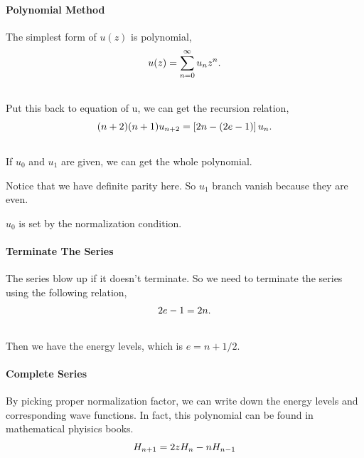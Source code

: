\documentclass[letterpaper,10pt,english]{sphinxmanual}
\begin{document}
\paragraph{Polynomial Method}
\label{QuantumMechanics:polynomial-method}
The simplest form of $u(z)$ is polynomial,
\begin{gather}
\begin{split}u(z) = \sum _ {n=0}^{\infty} u _ n z^n  .\end{split}\notag\\\begin{split}\end{split}\notag
\end{gather}
Put this back to equation of u, we can get the recursion relation,
\begin{gather}
\begin{split}(n + 2)(n+1) u _ {n+2} = \left[ 2n - (2e - 1) \right] u _ n   .\end{split}\notag\\\begin{split}\end{split}\notag
\end{gather}
If $u_0$ and $u_1$ are given, we can get the whole polynomial.

Notice that we have definite parity here. So $u _ 1$ branch vanish because they are even.

$u_0$ is set by the normalization condition.


\paragraph{Terminate The Series}
\label{QuantumMechanics:terminate-the-series}
The series blow up if it doesn't terminate. So we need to terminate the series using the following relation,
\begin{gather}
\begin{split}2e - 1 = 2n .\end{split}\notag\\\begin{split}\end{split}\notag
\end{gather}
Then we have the energy levels, which is $e=n+1/2$.


\paragraph{Complete Series}
\label{QuantumMechanics:complete-series}
By picking proper normalization factor, we can write down the energy levels and corresponding wave functions. In fact, this polynomial can be found in mathematical phyisics books.
\begin{gather}
\begin{split}H _ {n+1} = 2 z H _n -n H _ {n-1}\end{split}\notag\\\begin{split}\end{split}\notag
\end{gather}
\end{document}
